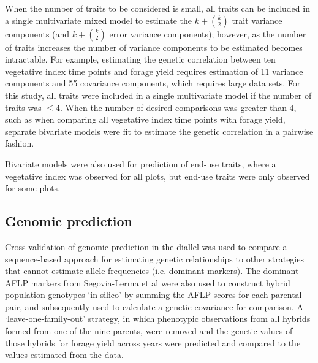 \documentclass[12pt, letterpaper]{article}
\begin{document}

When the number of traits to be considered is small, all traits can be included in a single multivariate mixed model to estimate the $k + \binom{k}{2}$ trait variance components (and $k + \binom{k}{2}$ error variance components); however, as the number of traits increases the number of variance components to be estimated becomes intractable. For example, estimating the genetic correlation between ten vegetative index time points and forage yield requires estimation of 11 variance components and 55 covariance components, which requires large data sets. For this study, all traits were included in a single multivariate model if the number of traits was $\leq 4$. When the number of desired comparisons was greater than 4, such as when comparing all vegetative index time points with forage yield, separate bivariate models were fit to estimate the genetic correlation in a pairwise fashion. 

Bivariate models were also used for prediction of end-use traits, where a vegetative index was observed for all plots, but end-use traits were only observed for some plots.  


\subsection{Genomic prediction}

Cross validation of genomic prediction in the diallel was used to compare a sequence-based approach for estimating genetic relationships to other strategies that cannot estimate allele frequencies (i.e. dominant markers). The dominant AFLP markers from Segovia-Lerma et al \parencite*{segovia2003} were also used to construct hybrid population genotypes `in silico' by summing the AFLP scores for each parental pair, and subsequently used to calculate a genetic covariance for comparison. A `leave-one-family-out' strategy, in which phenotypic observations from all hybrids formed from one of the nine parents, were removed and the genetic values of those hybrids for forage yield across years were predicted and compared to the values estimated from the data.
\end{document}
